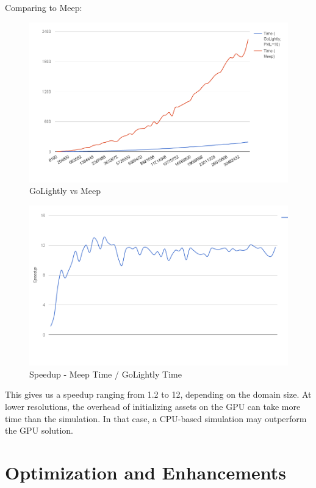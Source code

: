 Comparing to Meep:

\begin{figure}[H]
	\centering
	\includegraphics[width=\textwidth,
	keepaspectratio]{gpu-vs-meep.png}
	\caption{GoLightly vs Meep}
	\label{fig:gpuVsMeep}
\end{figure}

\begin{figure}[H]
	\centering
	\includegraphics[width=\textwidth,
	keepaspectratio]{gpu-vs-meep-speedup.png}
	\caption{Speedup - Meep Time / GoLightly Time}
	\label{fig:gpuVsMeepSpeedup}
\end{figure}

This gives us a speedup ranging from 1.2 to 12, depending on the domain size. At lower resolutions, the overhead of initializing assets on the GPU can take more time than the simulation. In that case, a CPU-based simulation may outperform the GPU solution.

\section{Optimization and Enhancements}


